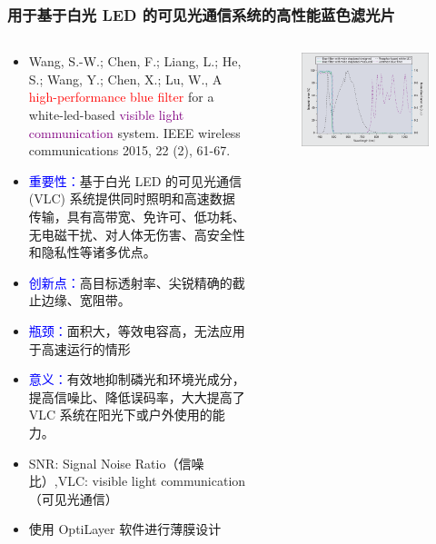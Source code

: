\begin{frame}[c]
    \frametitle{用于基于白光 LED 的可见光通信系统的高性能蓝色滤光片}
    \begin{columns}
        \begin{column}{.7\textwidth}
            \begin{itemize}
                \item Wang, S.-W.;  Chen, F.;  Liang, L.;  He, S.;  Wang, Y.;  Chen, X.; Lu, W., A \textcolor{red}{high-performance blue filter} for a white-led-based \textcolor{purple}{visible light communication} system. IEEE wireless communications 2015, 22 (2), 61-67.
                \item \textcolor{blue}{重要性：}基于白光 LED 的可见光通信 (VLC) 系统提供同时照明和高速数据传输，具有高带宽、免许可、低功耗、无电磁干扰、对人体无伤害、高安全性和隐私性等诸多优点。
                \item \textcolor{blue}{创新点：}高目标透射率、尖锐精确的截止边缘、宽阻带。
                \item \textcolor{blue}{瓶颈：}面积大，等效电容高，无法应用于高速运行的情形
                \item \textcolor{blue}{意义：}有效地抑制磷光和环境光成分，提高信噪比、降低误码率，大大提高了 VLC 系统在阳光下或户外使用的能力。
                \item \footnotesize{SNR: Signal Noise Ratio（信噪比）,VLC: visible light communication（可见光通信）}
                \item \footnotesize{使用 OptiLayer 软件进行薄膜设计}
            \end{itemize}
        \end{column}
        \begin{column}{.3\textwidth}
            \begin{figure}[H] %
                \centering %
                \includegraphics[width=1.1\textwidth]{figures/A high-performance blue filter for a white-led-based visible light communication system_1.png} %

\end{figure}
\end{column}
\end{columns}
\end{frame}
